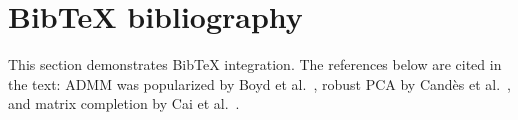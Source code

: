 \documentclass[11pt,a4paper]{article}
\theoremstyle{definition}
\theoremstyle{remark}
\begin{document}
\section{BibTeX bibliography}

This section demonstrates BibTeX integration. The references below are
cited in the text: ADMM was popularized by Boyd et al.~\cite{boyd2011distributed},
robust PCA by Cand\`es et al.~\cite{candes2011robust}, and matrix completion
by Cai et al.~\cite{cai2010singular}.


\end{document}

